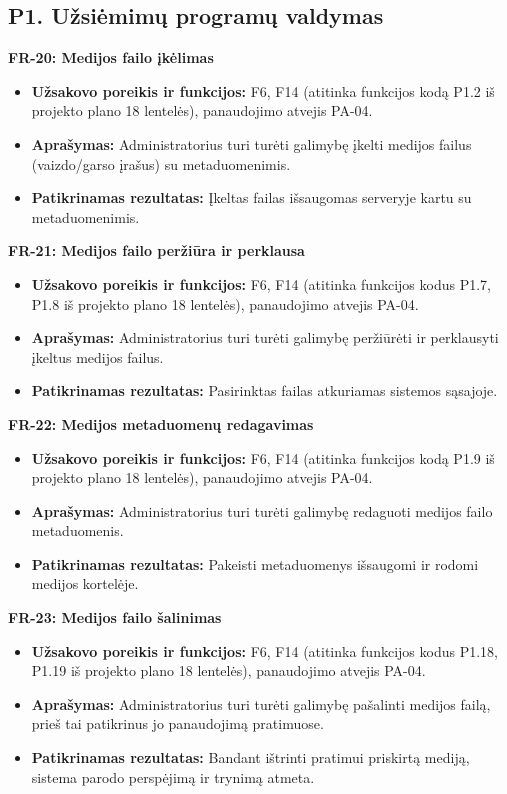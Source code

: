 \subsection{P1. Užsiėmimų programų valdymas}

\vspace{0.3cm}
\noindent\textbf{FR-20: Medijos failo įkėlimas}
\begin{itemize}
    \item \textbf{Užsakovo poreikis ir funkcijos:} F6, F14 (atitinka funkcijos kodą P1.2 iš projekto plano 18 lentelės), panaudojimo atvejis PA-04.
    \item \textbf{Aprašymas:} Administratorius turi turėti galimybę įkelti medijos failus (vaizdo/garso įrašus) su metaduomenimis.
    \item \textbf{Patikrinamas rezultatas:} Įkeltas failas išsaugomas serveryje kartu su metaduomenimis.
\end{itemize}

\vspace{0.3cm}
\noindent\textbf{FR-21: Medijos failo peržiūra ir perklausa}
\begin{itemize}
    \item \textbf{Užsakovo poreikis ir funkcijos:} F6, F14 (atitinka funkcijos kodus P1.7, P1.8 iš projekto plano 18 lentelės), panaudojimo atvejis PA-04.
    \item \textbf{Aprašymas:} Administratorius turi turėti galimybę peržiūrėti ir perklausyti įkeltus medijos failus.
    \item \textbf{Patikrinamas rezultatas:} Pasirinktas failas atkuriamas sistemos sąsajoje.
\end{itemize}

\vspace{0.3cm}
\noindent\textbf{FR-22: Medijos metaduomenų redagavimas}
\begin{itemize}
    \item \textbf{Užsakovo poreikis ir funkcijos:} F6, F14 (atitinka funkcijos kodą P1.9 iš projekto plano 18 lentelės), panaudojimo atvejis PA-04.
    \item \textbf{Aprašymas:} Administratorius turi turėti galimybę redaguoti medijos failo metaduomenis.
    \item \textbf{Patikrinamas rezultatas:} Pakeisti metaduomenys išsaugomi ir rodomi medijos kortelėje.
\end{itemize}

\vspace{0.3cm}
\noindent\textbf{FR-23: Medijos failo šalinimas}
\begin{itemize}
    \item \textbf{Užsakovo poreikis ir funkcijos:} F6, F14 (atitinka funkcijos kodus P1.18, P1.19 iš projekto plano 18 lentelės), panaudojimo atvejis PA-04.
    \item \textbf{Aprašymas:} Administratorius turi turėti galimybę pašalinti medijos failą, prieš tai patikrinus jo panaudojimą pratimuose.
    \item \textbf{Patikrinamas rezultatas:} Bandant ištrinti pratimui priskirtą mediją, sistema parodo perspėjimą ir trynimą atmeta.
\end{itemize}

